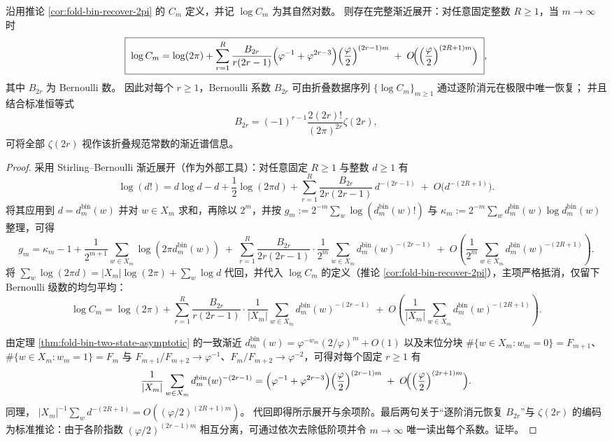 \begin{theorem}\label{thm:fold-bin-gauge-constant-stirling-bernoulli-hierarchy}
沿用推论 \ref{cor:fold-bin-recover-2pi} 的 \(C_m\) 定义，并记 \(\log C_m\) 为其自然对数。
则存在完整渐近展开：对任意固定整数 \(R\ge 1\)，当 \(m\to\infty\) 时
\[
\boxed{\;
\log C_m
=\log(2\pi)+
\sum_{r=1}^{R}
\frac{B_{2r}}{r(2r-1)}
\Bigl(\varphi^{-1}+\varphi^{2r-3}\Bigr)
\Bigl(\frac{\varphi}{2}\Bigr)^{(2r-1)m}
\;+\;
O\!\Bigl(\Bigl(\frac{\varphi}{2}\Bigr)^{(2R+1)m}\Bigr)\; } ,
\]
其中 \(B_{2r}\) 为 Bernoulli 数。
因此对每个 \(r\ge 1\)，Bernoulli 系数 \(B_{2r}\) 可由折叠数据序列 \(\{\log C_m\}_{m\ge 1}\) 通过逐阶消元在极限中唯一恢复；
并且结合标准恒等式
\[
B_{2r}=(-1)^{r-1}\frac{2(2r)!}{(2\pi)^{2r}}\zeta(2r),
\]
可将全部 \(\zeta(2r)\) 视作该折叠规范常数的渐近谱信息。
\end{theorem}
\begin{proof}
采用 Stirling--Bernoulli 渐近展开（作为外部工具）：对任意固定 \(R\ge 1\) 与整数 \(d\ge 1\) 有
\[
\log(d!)=d\log d-d+\frac12\log(2\pi d)+
\sum_{r=1}^{R}\frac{B_{2r}}{2r(2r-1)}\,d^{-(2r-1)}
\;+\;
O\!\bigl(d^{-(2R+1)}\bigr).
\]
将其应用到 \(d=d^{\mathrm{bin}}_m(w)\) 并对 \(w\in X_m\) 求和，再除以 \(2^m\)，并按
\(
g_m:=2^{-m}\sum_w\log(d^{\mathrm{bin}}_m(w)!)
\)
与
\(
\kappa_m:=2^{-m}\sum_w d^{\mathrm{bin}}_m(w)\log d^{\mathrm{bin}}_m(w)
\)
整理，可得
\[
g_m
=\kappa_m-1+\frac{1}{2^{m+1}}\sum_{w\in X_m}\log(2\pi d^{\mathrm{bin}}_m(w))
\;+\;
\sum_{r=1}^{R}\frac{B_{2r}}{2r(2r-1)}\cdot
\frac{1}{2^{m}}\sum_{w\in X_m} d^{\mathrm{bin}}_m(w)^{-(2r-1)}
\;+\;
O\!\left(\frac{1}{2^{m}}\sum_{w\in X_m} d^{\mathrm{bin}}_m(w)^{-(2R+1)}\right).
\]
将
\(
\sum_w\log(2\pi d)=|X_m|\log(2\pi)+\sum_w\log d
\)
代回，并代入 \(\log C_m\) 的定义（推论 \ref{cor:fold-bin-recover-2pi}），主项严格抵消，仅留下 Bernoulli 级数的均匀平均：
\[
\log C_m
=\log(2\pi)+
\sum_{r=1}^{R}\frac{B_{2r}}{r(2r-1)}\cdot
\frac{1}{|X_m|}\sum_{w\in X_m} d^{\mathrm{bin}}_m(w)^{-(2r-1)}
\;+\;
O\!\left(\frac{1}{|X_m|}\sum_{w\in X_m} d^{\mathrm{bin}}_m(w)^{-(2R+1)}\right).
\]
\par
由定理 \ref{thm:fold-bin-two-state-asymptotic} 的一致渐近
\(
d^{\mathrm{bin}}_m(w)=\varphi^{-w_m}(2/\varphi)^m+O(1)
\)
以及末位分块 \(\#\{w\in X_m:w_m=0\}=F_{m+1}\)、\(\#\{w\in X_m:w_m=1\}=F_m\) 与 \(F_{m+1}/F_{m+2}\to\varphi^{-1}\)、\(F_m/F_{m+2}\to\varphi^{-2}\)，可得对每个固定 \(r\ge 1\) 有
\[
\frac{1}{|X_m|}\sum_{w\in X_m} d^{\mathrm{bin}}_m(w)^{-(2r-1)}
=\Bigl(\varphi^{-1}+\varphi^{2r-3}\Bigr)\Bigl(\frac{\varphi}{2}\Bigr)^{(2r-1)m}
\;+\;
O\!\Bigl(\Bigl(\frac{\varphi}{2}\Bigr)^{(2r+1)m}\Bigr).
\]
同理，
\(
|X_m|^{-1}\sum_w d^{-(2R+1)}
=O((\varphi/2)^{(2R+1)m})
\)。
代回即得所示展开与余项阶。最后两句关于“逐阶消元恢复 \(B_{2r}\)”与 \(\zeta(2r)\) 的编码为标准推论：由于各阶指数 \((\varphi/2)^{(2r-1)m}\) 相互分离，可通过依次去除低阶项并令 \(m\to\infty\) 唯一读出每个系数。证毕。
\end{proof}

\endinput
